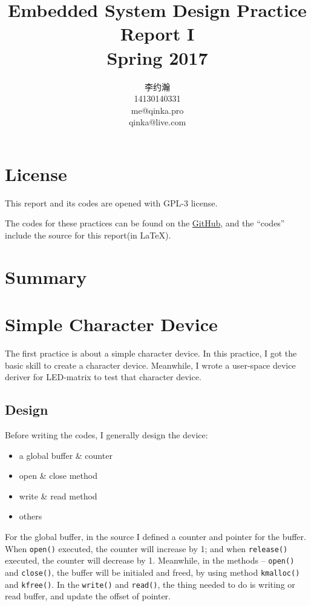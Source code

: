 \documentclass{report}
\title{Embedded System Design Practice Report I \\ Spring 2017}
\author{李约瀚 \\ 14130140331 \\ me@qinka.pro \\ qinka@live.com}
\begin{document}
    \maketitle
    \tableofcontents
    
    \chapter{License}
    \label{chap:license}
    This report and its codes are opened with GPL-3 license.
    
    The codes for these practices can be found on the%
    \href{https://github.com/Qinka/embedded-system-design-homework}{GitHub},
    and the ``codes'' include the source for this report(in \LaTeX).
    
    \chapter{Summary}
    \label{chap:summary}
    
    \chapter{Simple Character Device}
    \label{chap:scd}
    
    The first practice is about a simple character device. In this practice, I got the
    basic skill to create a character device. Meanwhile, I wrote a user-space device deriver for LED-matrix to test
    that character device.
    
    \section{Design}
    \label{chap:scd:design}
    
    Before writing the codes, I generally design the device:
    \begin{itemize}
        \item a global buffer \& counter
        \item open \& close method
        \item write \& read method
        \item others
    \end{itemize}
    
    For the global buffer, in the source I defined a counter and pointer for the buffer. When \lstinline|open()| executed,
    the counter will increase by 1; and when \lstinline|release()| executed, the counter will decrease by 1. 
    Meanwhile, in the methods -- \lstinline|open()| and \lstinline|close()|, the buffer will be initialed and 
    freed, by using method \lstinline|kmalloc()| and \lstinline|kfree()|. 
    In the \lstinline|write()| and \lstinline|read()|, the thing needed to do is writing or read buffer,
    and update the offset of pointer.
    
\end{document}
